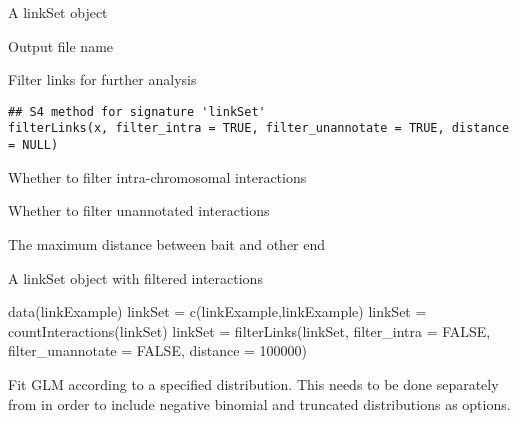 \documentclass[letterpaper]{book}
\begin{document}
%
\begin{Arguments}
\begin{ldescription}
\item[\code{x}] A linkSet object

\item[\code{outfile}] Output file name
\end{ldescription}
\end{Arguments}
%
\begin{Description}
Filter links for further analysis
\end{Description}
%
\begin{Usage}
\begin{verbatim}
## S4 method for signature 'linkSet'
filterLinks(x, filter_intra = TRUE, filter_unannotate = TRUE, distance = NULL)
\end{verbatim}
\end{Usage}
%
\begin{Arguments}
\begin{ldescription}
\item[\code{filter\_intra}] Whether to filter intra-chromosomal interactions

\item[\code{filter\_unannotate}] Whether to filter unannotated interactions

\item[\code{distance}] The maximum distance between bait and other end
\end{ldescription}
\end{Arguments}
%
\begin{Value}
A linkSet object with filtered interactions
\end{Value}
%
\begin{Examples}
\begin{ExampleCode}
data(linkExample)
linkSet = c(linkExample,linkExample)
linkSet = countInteractions(linkSet)
linkSet = filterLinks(linkSet, filter_intra = FALSE, filter_unannotate = FALSE, distance = 100000)
\end{ExampleCode}
\end{Examples}
%
\begin{Description}
Fit GLM according to a specified distribution. This needs to be done separately from 
in order to include negative binomial and truncated distributions as options.
\end{Description}
\end{document}

